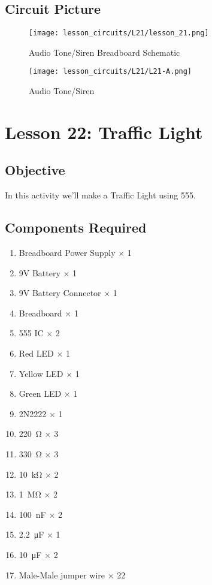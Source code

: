 \subsection{Circuit Picture}
\begin{figure}[!htp]
    \centering
    \texttt{[image: lesson\_circuits/L21/lesson\_21.png]}
    \caption{Audio Tone/Siren Breadboard Schematic}
    \label{fig:555_audsi_sch}
\end{figure}
\begin{figure}[!htp]
    \centering
    \texttt{[image: lesson\_circuits/L21/L21-A.png]}
    \caption{Audio Tone/Siren}
    \label{fig:555_audsi_obb}
\end{figure}
\clearpage
\section{Lesson 22: Traffic Light}
\subsection{Objective}
In this activity we'll make a Traffic Light using 555.
\subsection{Components Required}
\begin{enumerate}
    \item Breadboard Power Supply $\times$ 1
    \item 9V Battery $\times$ 1
    \item 9V Battery Connector $\times$ 1
    \item Breadboard $\times$ 1
    \item 555 IC $\times$ 2
    \item Red LED $\times$ 1
    \item Yellow LED $\times$ 1
    \item Green LED $\times$ 1
    \item 2N2222 $\times$ 1
    \item \SI{220}{\ohm} $\times$ 3
    \item \SI{330}{\ohm} $\times$ 3
    \item \SI{10}{\kilo\ohm} $\times$ 2
    \item \SI{1}{\Mohm} $\times$ 2
    \item \SI{100}{\nano\farad} $\times$ 2
    \item \SI{2.2}{\micro\farad} $\times$ 1
    \item \SI{10}{\micro\farad} $\times$ 2
    \item Male-Male jumper wire $\times$ 22
\end{enumerate}
